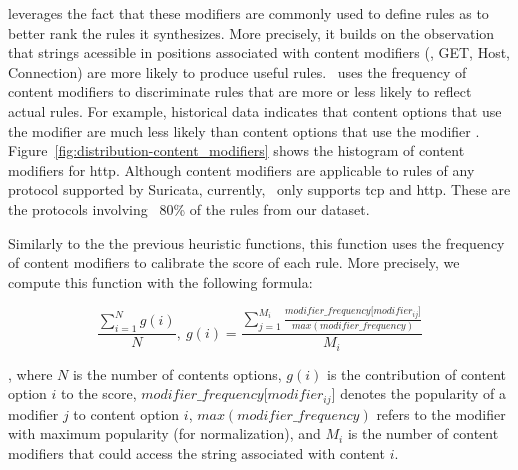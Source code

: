 \documentclass[sigconf,review, anonymous]{acmart}
\begin{document}
\tname{} leverages the fact that these modifiers are commonly used to
define rules as to better rank the rules it synthesizes. More
precisely, it builds on the observation that strings acessible in
positions associated with content modifiers (\eg{}, GET, Host,
Connection) are more likely to produce useful rules. \tname\ uses the
frequency of content modifiers to discriminate rules that are more or
less likely to reflect actual rules. For example, historical data
indicates that content options that use the 
modifier are much less likely than content options that use the
modifier
. Figure~\ref{fig:distribution-content_modifiers}
shows the histogram of content modifiers for http. Although content
modifiers are applicable to rules of any protocol supported by
Suricata, currently, \tname\ only supports tcp and http. These are the
protocols involving ~80\% of the rules from our dataset.


Similarly to the the previous heuristic functions, this function uses
the frequency of content modifiers to calibrate the score of each
rule. More precisely, we compute this function with the following
formula:

\[\frac{\sum_{i=1}^{N}g(i)}{N},~g(i)=\frac{\sum_{j=1}^{M_i}\frac{\mathit{modifier\_frequency[modifier_{ij}}]}{\mathit{max(modifier\_frequency)}}}{M_i}\]

\noindent
, where $N$ is the number of contents options, $g(i)$ is the
contribution of content option $i$ to the score,
$\mathit{modifier\_frequency[modifier_{ij}}]$ denotes the popularity
of a modifier $j$ to content option $i$,
$\mathit{max(modifier\_frequency)}$ refers to the modifier with
maximum popularity (for normalization), and $M_i$ is the number of
content modifiers that could access the string associated with content
$i$.


                                                                             
\end{document}
